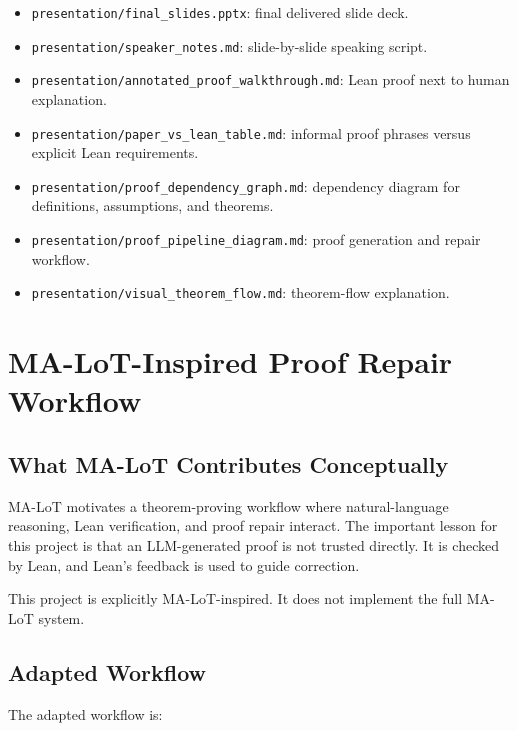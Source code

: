 \documentclass[11pt]{article}
\theoremstyle{definition}
\begin{document}
\begin{itemize}[leftmargin=*]
  \item \texttt{presentation/final\_slides.pptx}: final delivered slide deck.
  \item \texttt{presentation/speaker\_notes.md}: slide-by-slide speaking script.
  \item \texttt{presentation/annotated\_proof\_walkthrough.md}: Lean proof next to human explanation.
  \item \texttt{presentation/paper\_vs\_lean\_table.md}: informal proof phrases versus explicit Lean requirements.
  \item \texttt{presentation/proof\_dependency\_graph.md}: dependency diagram for definitions, assumptions, and theorems.
  \item \texttt{presentation/proof\_pipeline\_diagram.md}: proof generation and repair workflow.
  \item \texttt{presentation/visual\_theorem\_flow.md}: theorem-flow explanation.
\end{itemize}

\section{MA-LoT-Inspired Proof Repair Workflow}

\subsection{What MA-LoT Contributes Conceptually}

MA-LoT motivates a theorem-proving workflow where natural-language reasoning,
Lean verification, and proof repair interact. The important lesson for this
project is that an LLM-generated proof is not trusted directly. It is checked by
Lean, and Lean's feedback is used to guide correction.

This project is explicitly MA-LoT-inspired. It does not implement the full
MA-LoT system.

\subsection{Adapted Workflow}

The adapted workflow is:
\end{document}
